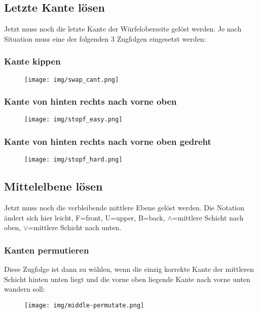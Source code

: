 \documentclass[letterpaper,10pt,twoside,twocolumn,openany]{book}
\begin{document}
\subsection{Letzte Kante lösen}
\begin{justify}
Jetzt muss noch die letzte Kante der Würfeloberseite gelöst werden. Je nach  Situation muss eine der folgenden 3 Zugfolgen eingesetzt werden:
\end{justify}
\subsubsection{Kante kippen}
\begin{figure}[!htb] 
  \centering
     \texttt{[image: img/swap\_cant.png]}
\end{figure}
\newpage
\subsubsection{Kante von hinten rechts nach \newline vorne oben}
\begin{figure}[!htb] 
  \centering
     \texttt{[image: img/stopf\_easy.png]}
\end{figure}

\subsubsection{Kante von hinten rechts nach \newline vorne oben gedreht}
\begin{figure}[!htb] 
  \centering
     \texttt{[image: img/stopf\_hard.png]}
\end{figure}

\subsection{Mittelelbene lösen}
\begin{justify}
Jetzt muss noch die verbleibende mittlere Ebene gelöst werden. Die Notation ändert sich hier leicht, F=front, U=upper, B=back, $\wedge$=mittlere Schicht nach oben, $\vee$=mittlere Schicht nach unten.
\end{justify}
\subsubsection{Kanten permutieren}
\begin{justify}
Diese Zugfolge ist dann zu wählen, wenn die einzig korrekte Kante der mittleren Schicht hinten unten liegt und die vorne oben liegende Kante nach vorne unten wandern soll:
\end{justify}
\begin{figure}[!htb] 
  \centering
     \texttt{[image: img/middle-permutate.png]}
\end{figure}
\newpage
\end{document}
